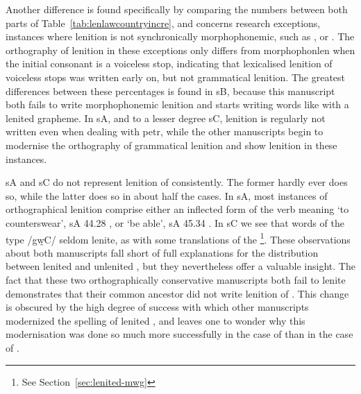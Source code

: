 Another difference is found specifically by comparing the numbers between both parts of Table~\ref{tab:lenlawcountryincre}, and concerns research exceptions, \ie instances where lenition is not synchronically morphophonemic, such as , or . The orthography of lenition in these exceptions only differs from \gls{morphophonlen} when the initial consonant is a voiceless stop, indicating that lexicalised lenition of voiceless stops was written early on, but not grammatical lenition. The greatest differences between these percentages is found in \gls{sB}, because this manuscript both fails to write morphophonemic lenition and starts writing words like  with a lenited grapheme. In \gls{sA}, and to a lesser degree \gls{sC}, lenition is regularly not written even when dealing with \gls{petr}, while the other manuscripts begin to modernise the orthography of grammatical lenition and show lenition in these instances.

\Gls{sA} and \gls{sC} do not represent lenition of  consistently. The former hardly ever does so, while the latter does so in about half the cases. In \gls{sA}, most instances of orthographical lenition comprise either an inflected form of the verb meaning `to counterswear', \eg \gls{sA} 44.28 , or `be able', \eg \gls{sA} 45.34 . In \gls{sC} we see that words of the type /gw̯\gls{C}/ seldom lenite, as with some translations of the \footnote{See Section~\ref{sec:lenited-mwg}}. These observations about both manuscripts fall short of full explanations for the distribution between lenited and unlenited , but they nevertheless offer a valuable insight. The fact that these two orthographically conservative manuscripts both fail to lenite  demonstrates that their common ancestor did not write lenition of . This change is obscured by the high degree of success with which other manuscripts modernized the spelling of lenited , and leaves one to wonder why this modernisation was done so much more successfully in the case of  than in the case of .

